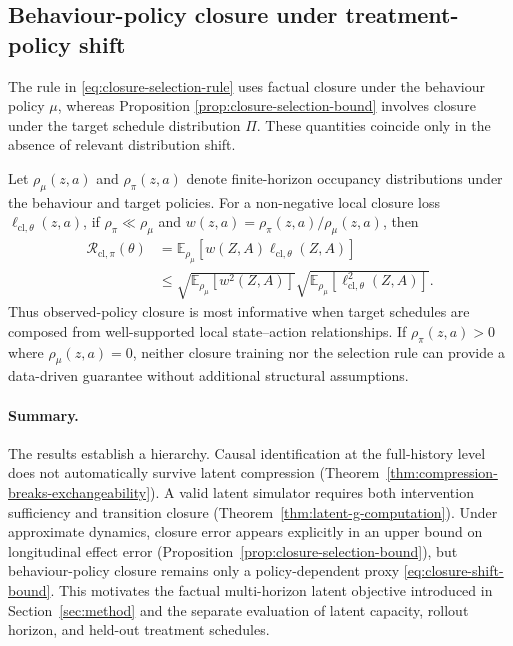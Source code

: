 \subsection{Behaviour-policy closure under treatment-policy shift}
\label{sec:policy-shift-theory}

The rule in \eqref{eq:closure-selection-rule} uses factual closure under
the behaviour policy $\mu$, whereas Proposition
\ref{prop:closure-selection-bound} involves closure under the target
schedule distribution $\Pi$. These quantities coincide only in the
absence of relevant distribution shift.

Let $\rho_\mu(z,a)$ and $\rho_\pi(z,a)$ denote finite-horizon occupancy
distributions under the behaviour and target policies. For a non-negative
local closure loss $\ell_{\mathrm{cl},\theta}(z,a)$, if
$\rho_\pi\ll\rho_\mu$ and
$w(z,a)=\rho_\pi(z,a)/\rho_\mu(z,a)$, then
\begin{equation}
\begin{split}
    \mathcal R_{\mathrm{cl},\pi}(\theta)
    &=\mathbb E_{\rho_\mu}
      [w(Z,A)\ell_{\mathrm{cl},\theta}(Z,A)]\\
    &\leq
    \sqrt{\mathbb E_{\rho_\mu}[w^2(Z,A)]}
    \sqrt{\mathbb E_{\rho_\mu}
      [\ell_{\mathrm{cl},\theta}^2(Z,A)]}.
\end{split}
    \label{eq:closure-shift-bound}
\end{equation}
Thus observed-policy closure is most informative when target schedules
are composed from well-supported local state--action relationships. If
$\rho_\pi(z,a)>0$ where $\rho_\mu(z,a)=0$, neither closure training nor
the selection rule can provide a data-driven guarantee without additional
structural assumptions.

\paragraph{Summary.}
The results establish a hierarchy. Causal identification at the
full-history level does not automatically survive latent compression
(Theorem~\ref{thm:compression-breaks-exchangeability}). A valid latent
simulator requires both intervention sufficiency and transition closure
(Theorem~\ref{thm:latent-g-computation}). Under approximate dynamics,
closure error appears explicitly in an upper bound on longitudinal
effect error (Proposition~\ref{prop:closure-selection-bound}), but
behaviour-policy closure remains only a policy-dependent proxy
\eqref{eq:closure-shift-bound}. This motivates the factual multi-horizon
latent objective introduced in Section~\ref{sec:method} and the separate
evaluation of latent capacity, rollout horizon, and held-out treatment
schedules.

